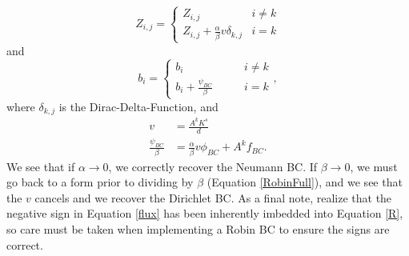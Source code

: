 \documentclass[11pt,letterpaper,oneside,notitlepage]{article}	%
\newcommand{\eq}[1]{Equation \eqref{#1}}		%
\begin{document}
\begin{equation}
Z_{i,j} = \begin{cases}
Z_{i,j} & i\neq k\\
Z_{i,j} + \frac{\alpha}{\beta}v\delta_{k,j} & i=k
\end{cases}
\end{equation}
and
\begin{equation}
b_i = \begin{cases}
b_i &\qquad i\neq k\\
b_i + \frac{\psi_{BC}}{\beta}&\qquad i=k
\end{cases}
,\end{equation}
where $\delta_{k,j}$ is the Dirac-Delta-Function, and 
\begin{align*}
v&=\frac{A^k K^{s}}{d} \\
\frac{\psi_{BC}}{\beta} &=  \frac{\alpha}{\beta} v \phi_{BC} + A^k f_{BC}
.\end{align*}
We see that if $\alpha \to 0$, we correctly recover the Neumann BC. If $\beta\to 0$, we must go back to a form prior to dividing by $\beta$ (\eq{RobinFull}), and we see that the $v$ cancels and we recover the Dirichlet BC.
As a final note, realize that the negative sign in \eq{flux} has been inherently imbedded into \eq{R}, so care must be taken when implementing a Robin BC to ensure the signs are correct.
\end{document}
